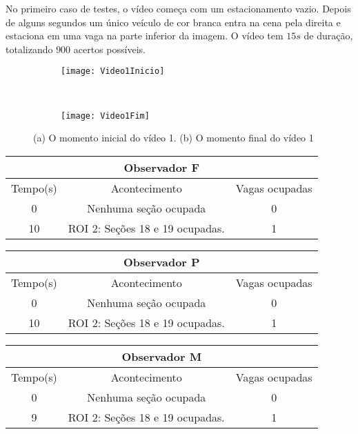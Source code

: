 No primeiro caso de testes, o vídeo começa com um estacionamento vazio. Depois de alguns segundos um único veículo de cor branca entra na cena pela direita e estaciona em uma vaga na parte inferior da imagem. O vídeo tem $15s$ de duração, totalizando $900$ acertos possíveis.

\begin{figure}[!h]
\centering
\begin{subfigure}{.5\textwidth}
\centering
\texttt{[image: Video1Inicio]}
\caption{}
\end{subfigure}\
\begin{subfigure}{.5\textwidth}
\centering
\texttt{[image: Video1Fim]}
\caption{}
\end{subfigure}
\centering
\caption{(a) O momento inicial do vídeo 1. (b) O momento final do vídeo 1}%
\label{}%
\end{figure}


\begin{center}
\begin{tabular}{|c||c||c|}
\hline
\multicolumn{3}{|c|}{Observador F}  \\ \hline \hline
Tempo(s) & Acontecimento & Vagas ocupadas\\ \hline
0 & Nenhuma seção ocupada & 0 \\ \hline
10 & ROI 2: Seções 18 e 19 ocupadas. & 1 \\
\hline
\end{tabular}
\end{center}

\begin{center}
\begin{tabular}{|c||c||c|}
\hline
\multicolumn{3}{|c|}{Observador P}  \\ \hline \hline
Tempo(s) & Acontecimento & Vagas ocupadas\\ \hline
0 & Nenhuma seção ocupada & 0 \\ \hline
10 & ROI 2: Seções 18 e 19 ocupadas. & 1 \\
\hline
\end{tabular}
\end{center}

\begin{center}
\begin{tabular}{|c||c||c|}
\hline
\multicolumn{3}{|c|}{Observador M}  \\ \hline \hline
Tempo(s) & Acontecimento & Vagas ocupadas\\ \hline
0 & Nenhuma seção ocupada & 0 \\ \hline
9 & ROI 2: Seções 18 e 19 ocupadas. & 1 \\
\hline
\end{tabular}
\end{center}

